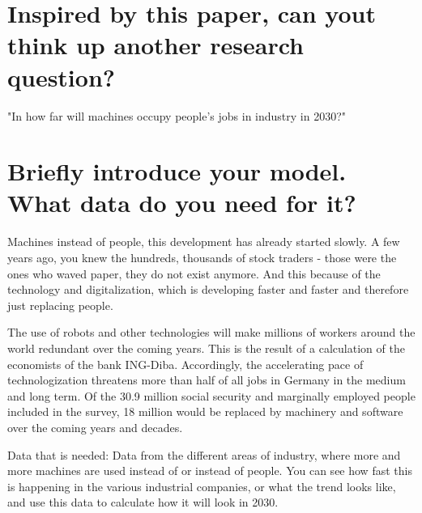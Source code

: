 \documentclass{article}
\begin{document}
\section{Inspired by this paper, can yout think up another research question? }
"In how far will machines occupy people's jobs in industry in 2030?"

\section{Briefly introduce your model. What data do you need for it?}

Machines instead of people, this development has already started slowly. A few years ago, you knew the hundreds, thousands of stock traders - those were the ones who waved paper, they do not exist anymore. And this because of the technology and digitalization, which is developing faster and faster and therefore just replacing people.

The use of robots and other technologies will make millions of workers around the world redundant over the coming years. This is the result of a calculation of the economists of the bank ING-Diba. Accordingly, the accelerating pace of technologization threatens more than half of all jobs in Germany in the medium and long term. Of the 30.9 million social security and marginally employed people included in the survey, 18 million would be replaced by machinery and software over the coming years and decades.

Data that is needed: Data from the different areas of industry, where more and more machines are used instead of or instead of people. You can see how fast this is happening in the various industrial companies, or what the trend looks like, and use this data to calculate how it will look in 2030.
\end{document}
